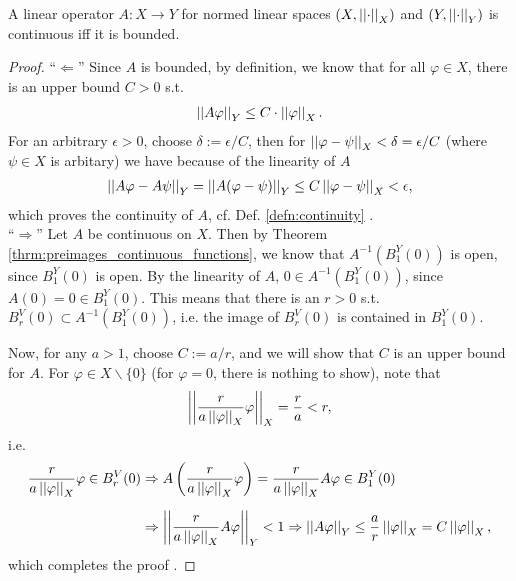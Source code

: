 \begin{theorem}\label{thrm:continuous-operator-bounded}
	A linear operator $A:X\to Y$ for normed linear spaces $\left(X, \left\vert\left\vert \cdot \right\vert\right\vert_{X}\right)$ and $\left( Y, \left\vert\left\vert \cdot \right\vert\right\vert_{Y}\right)$ is continuous iff it is bounded.
\end{theorem}

\begin{proof}
	\enquote{$\Longleftarrow$} Since $A$ is bounded, by definition, we know that for all $\varphi\in X$, there is an upper bound $C > 0$ s.t. 
	\begin{align}
		\left\vert\left\vert A\varphi \right\vert\right\vert_{Y} \leq C\cdot \left\vert\left\vert \varphi \right\vert\right\vert_{X}.
	\end{align}
	For an arbitrary $\epsilon > 0$, choose $\delta := \epsilon/C$, then for $\left\vert\left\vert \varphi - \psi \right\vert\right\vert_{X} < \delta = \epsilon/C$ (where $\psi\in X$ is arbitary) we have because of the linearity of $A$
	\begin{align}
		\left\vert\left\vert A\varphi - A\psi \right\vert\right\vert_{Y} = \left\vert\left\vert A(\varphi - \psi) \right\vert\right\vert_{Y} \leq C\left\vert\left\vert \varphi - \psi \right\vert\right\vert_{X} < \epsilon,
	\end{align}
	which proves the continuity of $A$, cf. Def. \ref{defn:continuity} \cite{556667}.
	\\
	
	\enquote{$\Longrightarrow$} Let $A$ be continuous on $X$. Then by Theorem \ref{thrm:preimages_continuous_functions}, we know that $A^{-1}\left(B^{Y}_1(0)\right)$ is open, since $B^{Y}_{1}(0)$ is open. By the linearity of $A$, $0\in A^{-1}\left(B^{Y}_1(0)\right)$, since \\ $A(0) = 0 \in B_1^{Y}(0)$. This means that there is an $r > 0$ s.t. $B^{V}_{r}(0) \subset A^{-1}\left(B^{Y}_1(0)\right)$, i.e. the image of $B^{V}_{r}(0)$ is contained in $B^{Y}_{1}(0)$.
	
	Now, for any $a > 1$, choose $C := a/r$, and we will show that $C$ is an upper bound for $A$. For $\varphi\in X\backslash \{0\}$ (for $\varphi =0$, there is nothing to show), note that $$\left\vert\left\vert \frac{r}{a\left\vert\left\vert \varphi \right\vert\right\vert_{X}}\varphi \right\vert\right\vert_{X} = \frac{r}{a} < r,$$ i.e. 
	\begin{align}
		\frac{r}{a\left\vert\left\vert \varphi \right\vert\right\vert_{X}}\varphi \in B_{r}^{V}(0) &\Rightarrow A\left(\frac{r}{a\left\vert\left\vert \varphi \right\vert\right\vert_{X}}\varphi\right) = \frac{r}{a\left\vert\left\vert \varphi \right\vert\right\vert_{X}}A\varphi\in B^{Y}_{1}(0) 
		\\[6pt] &\Rightarrow \left\vert\left\vert \frac{r}{a\left\vert\left\vert \varphi \right\vert\right\vert_{X}}A\varphi \right\vert\right\vert_{Y} < 1 \Rightarrow \left\vert\left\vert A\varphi \right\vert\right\vert_{Y} \leq \frac{a}{r}\left\vert\left\vert \varphi \right\vert\right\vert_{X} = C\left\vert\left\vert \varphi \right\vert\right\vert_{X},
	\end{align}
	which completes the proof \cite[p. 2]{src:mit_lec}.
\end{proof}

